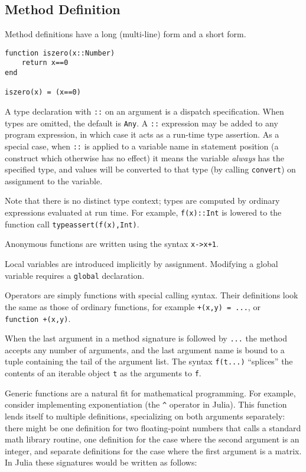 \documentclass[9pt]{sigplanconf}
\begin{document}
\subsection{Method Definition}
Method definitions have a long (multi-line) form and a short form.

\begin{verbatim}
function iszero(x::Number)
    return x==0
end

iszero(x) = (x==0)
\end{verbatim}

A type declaration with {\tt ::} on an argument is a dispatch specification.
When types are omitted, the default is {\tt Any}.
A {\tt ::} expression may be added to any program expression, in which case
it acts as a run-time type assertion. As a special case, when {\tt ::} is
applied to a variable name in statement position (a construct which otherwise
has no effect) it means the variable \emph{always} has the specified type,
and values will be converted to that type (by calling {\tt convert}) on
assignment to the variable.

Note that there is no distinct type context; types are computed by ordinary
expressions
evaluated at run time. For example, {\tt f(x)::Int} is lowered to the
function call {\tt typeassert(f(x),Int)}.

Anonymous functions are written using the syntax {\tt x->x+1}.

Local variables are introduced implicitly by assignment. Modifying a
global variable requires a {\tt global} declaration.

Operators are simply functions with special calling syntax. Their
definitions look the same as those of ordinary functions, for example
{\tt +(x,y)~=~...}, or {\tt function~+(x,y)}.

When the last argument in a method signature is followed by {\tt ...}
the method accepts any number of arguments, and the last argument name
is bound to a tuple containing the tail of the argument list. The syntax
{\tt f(t...)} ``splices'' the contents of an iterable object {\tt t} as the
arguments to {\tt f}.

Generic functions are a natural fit for mathematical programming. For example,
consider implementing exponentiation (the {\tt \^{}} operator in Julia).
This function
lends itself to multiple definitions, specializing on both arguments
separately: there might be one definition for two floating-point numbers that
calls a standard math library routine, one definition for the case where the
second argument is an integer, and separate definitions for the case where the
first argument is a matrix. In Julia these signatures would be written as
follows:
\end{document}
